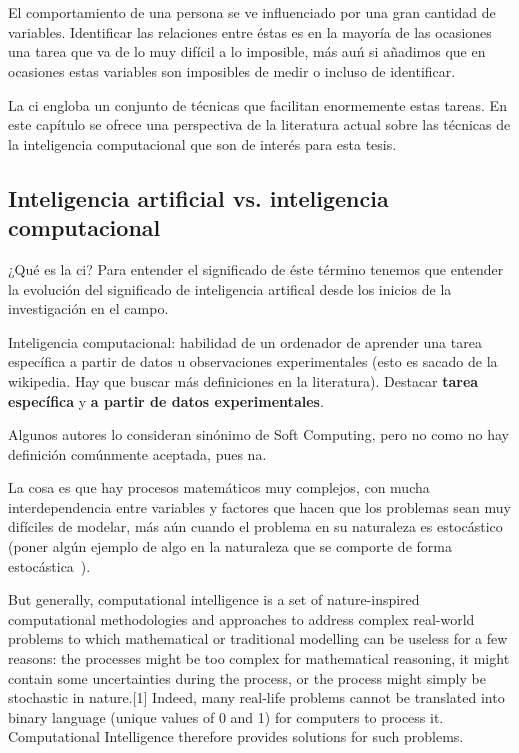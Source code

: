 \chapter{}
\label{ch:sota-ic}

El comportamiento de una persona se ve influenciado por una gran cantidad de variables. Identificar las relaciones entre éstas es en la mayoría de las ocasiones una tarea que va de lo muy difícil a lo imposible, más auń si añadimos que en ocasiones estas variables son imposibles de medir o incluso de identificar.

La \gls{ci} engloba un conjunto de técnicas que facilitan enormemente estas tareas. En este capítulo se ofrece una perspectiva de la literatura actual sobre las técnicas de la inteligencia computacional que son de interés para esta tesis.

\section{Inteligencia artificial vs. inteligencia computacional}

¿Qué es la \gls{ci}? Para entender el significado de éste término tenemos que entender la evolución del significado de inteligencia artifical desde los inicios de la investigación en el campo.

Inteligencia computacional: habilidad de un ordenador de aprender una tarea específica a partir de datos u observaciones experimentales (esto es sacado de la wikipedia. Hay que buscar más definiciones en la literatura). Destacar \textbf{tarea específica} y \textbf{a partir de datos experimentales}.

Algunos autores lo consideran sinónimo de Soft Computing, pero no como no hay definición comúnmente aceptada, pues na.

La cosa es que hay procesos matemáticos muy complejos, con mucha interdependencia entre variables y factores que hacen que los problemas sean muy difíciles de modelar, más aún cuando el problema en su naturaleza es estocástico (poner algún ejemplo de algo en la naturaleza que se comporte de forma estocástica~\cite{siddique2013computational}).

But generally, computational intelligence is a set of nature-inspired computational methodologies and approaches to address complex real-world problems to which mathematical or traditional modelling can be useless for a few reasons: the processes might be too complex for mathematical reasoning, it might contain some uncertainties during the process, or the process might simply be stochastic in nature.[1] Indeed, many real-life problems cannot be translated into binary language (unique values of 0 and 1) for computers to process it. Computational Intelligence therefore provides solutions for such problems.




